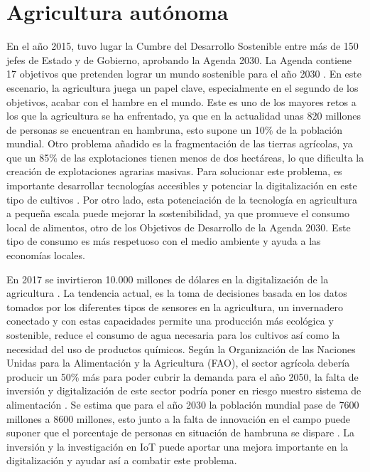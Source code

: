 \documentclass[a4paper, 12pt, oneside]{book}
\begin{document}
\section{Agricultura autónoma}
\label{sec:agricultura autonoma}
En el año 2015, tuvo lugar la Cumbre del Desarrollo Sostenible entre más de 150 jefes de Estado y de Gobierno, aprobando  la Agenda 2030. La Agenda contiene 17 objetivos que pretenden lograr un mundo sostenible para el año 2030 \cite{agenda}. En este escenario, la agricultura juega un papel clave, especialmente en el segundo de los objetivos, acabar con el hambre en el mundo. Este es uno de los mayores retos a los que la agricultura se ha enfrentado, ya que en la actualidad unas 820 millones de personas se encuentran en hambruna, esto supone un 10\% de la población mundial. Otro problema añadido es la fragmentación de las tierras agrícolas, ya que un 85\% de las explotaciones tienen menos de dos hectáreas, lo que dificulta la creación de explotaciones agrarias masivas. Para solucionar este problema, es importante desarrollar tecnologías accesibles y potenciar la digitalización en este tipo de cultivos \cite{papel_agricultura}. Por otro lado, esta potenciación de la tecnología en agricultura a pequeña escala puede mejorar la sostenibilidad, ya que promueve el consumo local de alimentos, otro de los Objetivos de Desarrollo de la Agenda 2030. Este tipo de consumo es más respetuoso con el medio ambiente y ayuda a las economías locales.

En 2017 se invirtieron 10.000 millones de dólares en la digitalización de la agricultura \cite{connected_greenhouses}. La tendencia actual, es la toma de decisiones basada en los datos tomados por los diferentes tipos de sensores en la agricultura, un invernadero conectado y con estas capacidades permite una producción más ecológica y sostenible, reduce el consumo de agua necesaria para los cultivos así como la necesidad del uso de productos químicos.
Según la Organización de las Naciones Unidas para la Alimentación y la Agricultura (FAO), el sector agrícola debería producir un 50\% más para poder cubrir la demanda para el año 2050, la falta de inversión y digitalización de este sector podría poner en riesgo nuestro sistema de alimentación \cite{alimentos_2050}. Se estima que para el año 2030 la población mundial pase de 7600 millones a 8600 millones, esto junto a la falta de innovación en el campo puede suponer que el porcentaje de personas en situación de hambruna se dispare \cite{poblacion_mundial}. La inversión y la investigación en IoT puede aportar una mejora importante en la digitalización y ayudar así a combatir este problema.
\end{document}
